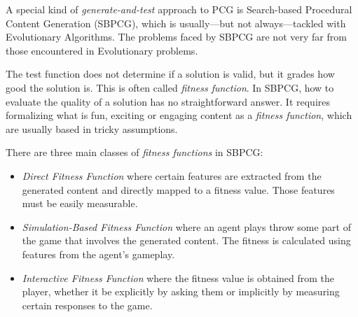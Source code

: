 A special kind of \textit{generate-and-test} approach to PCG is Search-based Procedural Content Generation (SBPCG), which is usually---but not always---tackled with Evolutionary Algorithms. The problems faced by SBPCG are not very far from those encountered in Evolutionary problems. 

The test function does not determine if a solution is valid, but it grades how good the solution is. This is often called \textit{fitness function}. In SBPCG, how to evaluate the quality of a solution has no straightforward answer. It requires formalizing what is fun, exciting or engaging content as a \textit{fitness function}, which are usually based in tricky assumptions.


There are three main classes of \textit{fitness functions} in SBPCG\cite{togelius2010search}:

\begin{itemize}
	\item \textit{Direct Fitness Function} where certain features are extracted from the generated content and directly mapped to a fitness value. Those features must be easily measurable.
	\item \textit{Simulation-Based Fitness Function} where an agent plays throw some part of the game that involves the generated content. The fitness is calculated using features from the agent's gameplay. 
	
	\item \textit{Interactive Fitness Function} where the fitness value is obtained from the player, whether it be explicitly by asking them or implicitly by measuring certain responses to the game. 
\end{itemize}

